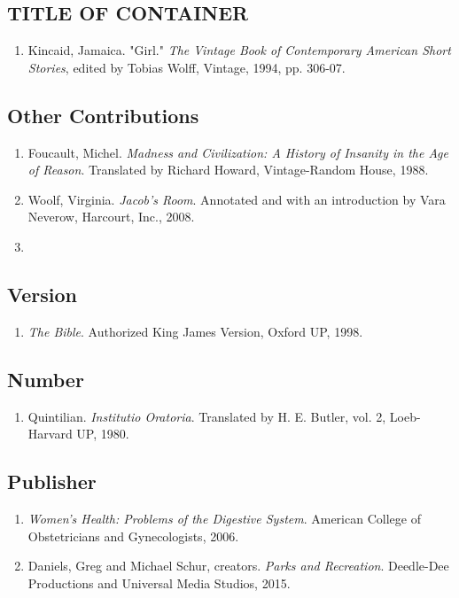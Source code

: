 \documentclass[12pt]{article} %
\begin{document}
\subsection*{TITLE OF CONTAINER}
\begin{enumerate}
  \item Kincaid, Jamaica. "Girl." \textit{The Vintage Book of Contemporary American Short Stories}, edited by Tobias Wolff,
  Vintage, 1994, pp. 306-07.
\end{enumerate}


\subsection*{Other Contributions}

\begin{enumerate}
  \item Foucault, Michel. \textit{Madness and Civilization: A History of Insanity in the Age of Reason}. Translated by Richard Howard,
  Vintage-Random House, 1988.
  \item Woolf, Virginia. \textit{Jacob’s Room}. Annotated and with an introduction by Vara Neverow, Harcourt, Inc., 2008.
  \item 
\end{enumerate}

\subsection*{Version}

\begin{enumerate}
  \item \textit{The Bible}. Authorized King James Version, Oxford UP, 1998.
\end{enumerate}


\subsection*{Number}
\begin{enumerate}
  \item Quintilian. \textit{Institutio Oratoria}. Translated by H. E. Butler, vol. 2, Loeb-Harvard UP, 1980.
\end{enumerate}


\subsection*{Publisher}
\begin{enumerate}
  \item \textit{Women's Health: Problems of the Digestive System}. American College of Obstetricians and Gynecologists, 2006.
  \item Daniels, Greg and Michael Schur, creators. \textit{Parks and Recreation}. Deedle-Dee Productions and Universal Media Studios, 2015.
\end{enumerate}
\end{document}
